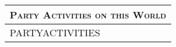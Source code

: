 \documentclass[12pt,letterpaper,twocolumn]{article}
\begin{document}
\begin{tabularx}{\linewidth}{| X |}
    \multicolumn{1}{l}{\textsc{Party Activities on this World}} \\
    \hline
    PARTYACTIVITIES \ \newline \newline \newline \newline \newline \newline \newline \newline \newline  \newline \newline \newline \newline \newline \newline\\
    \hline
\end{tabularx}
\end{document}
